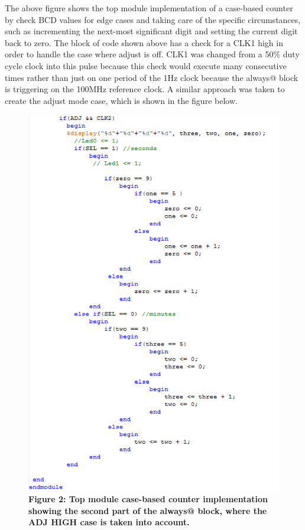 \documentclass[journal]{IEEEtran}
\begin{document}
The above figure shows the top module implementation of a case-based counter by check BCD values for edge cases and taking care of the specific circumstances, such as incrementing the next-most significant digit and setting the current digit back to zero. The block of code shown above has a check for a CLK1 high in order to handle the case where adjust is off. CLK1 was changed from a 50\% duty cycle clock into this pulse because this check would execute many consecutive times rather than just on one period of the 1Hz clock because the always@ block is triggering on the 100MHz reference clock. A similar approach was taken to create the adjust mode case, which is shown in the figure below.

\begin{figure}[H]
	\centering\includegraphics[scale=0.6]{topmodsel}
	\caption{\textbf{Figure 2: Top module case-based counter implementation showing the second part of the always@ block, where the ADJ HIGH case is taken into account.}}
\end{figure}
\end{document}
